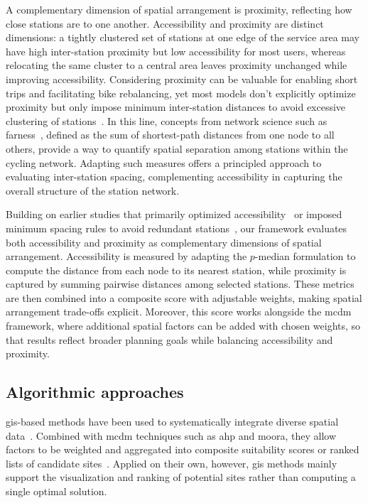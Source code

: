 A complementary dimension of spatial arrangement is proximity, reflecting how close stations are to one another. Accessibility and proximity are distinct dimensions: a tightly clustered set of stations at one edge of the service area may have high inter-station proximity but low accessibility for most users, whereas relocating the same cluster to a central area leaves proximity unchanged while improving accessibility. Considering proximity can be valuable for enabling short trips and facilitating bike rebalancing, yet most models don't explicitly optimize proximity but only impose minimum inter-station distances to avoid excessive clustering of stations~\cite{Nikiforiadis2021, Kabak2018}. In this line, concepts from network science such as farness~\cite{Sabidussi1966}, defined as the sum of shortest-path distances from one node to all others, provide a way to quantify spatial separation among stations within the cycling network. Adapting such measures offers a principled approach to evaluating inter-station spacing, complementing accessibility in capturing the overall structure of the station network.

Building on earlier studies that primarily optimized accessibility~\cite{Frade2015, Cintrano2018, Lin2011, Mete2018} or imposed minimum spacing rules to avoid redundant stations~\cite{Nikiforiadis2021, Kabak2018}, our framework evaluates both accessibility and proximity as complementary dimensions of spatial arrangement. Accessibility is measured by adapting the $p$-median formulation to compute the distance from each node to its nearest station, while proximity is captured by summing pairwise distances among selected stations. These metrics are then combined into a composite score with adjustable weights, making spatial arrangement trade-offs explicit. Moreover, this score works alongside the \ac{mcdm} framework, where additional spatial factors can be added with chosen weights, so that results reflect broader planning goals while balancing accessibility and proximity.


\subsection{Algorithmic approaches}

\ac{gis}-based methods have been used to systematically integrate diverse spatial data~\cite{GarciaPalomares2012, Ebrahimi2022}. Combined with \ac{mcdm} techniques such as \ac{ahp} and \ac{moora}, they allow factors to be weighted and aggregated into composite suitability scores or ranked lists of candidate sites~\cite{Kabak2018, Bahadori2022, Guler2021a, Guler2021b}. Applied on their own, however, \ac{gis} methods mainly support the visualization and ranking of potential sites rather than computing a single optimal solution.

